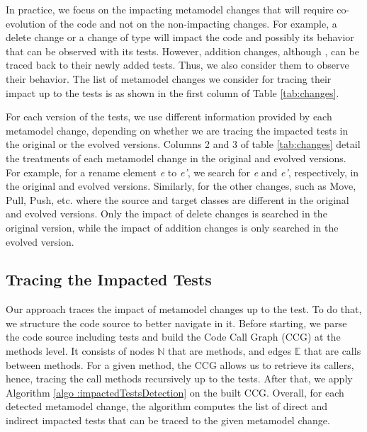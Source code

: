 \blue{}In practice, we focus on the impacting metamodel changes that will require co-evolution of the code and not on the non-impacting changes. For example, a delete change or a change of type will impact the code and possibly its behavior that can be observed with its tests. 
However, addition changes, although , can be traced back to their newly added tests. Thus, we also consider them to observe their behavior.
The list of metamodel changes \cite{iovino2012impact,cicchetti_managing_2009} we consider for tracing their impact up to the tests is as shown in the first column of Table \ref{tab:changes}. 

For each version of the tests, we use different information provided by each metamodel change, depending on whether we are tracing the impacted tests in the original or the evolved versions. Columns 2 and 3 of table \ref{tab:changes} detail the treatments of each metamodel change in the original and evolved versions. For example, for a rename element \emph{e} to \emph{e'}, we search for \emph{e} and \emph{e'}, respectively, in the original and evolved versions. Similarly, for the other changes, such as Move, Pull, Push, etc. where the source and target classes are different in the original and evolved versions. Only the impact of delete changes is searched in the original version, while the impact of addition changes is only searched in the evolved version. 





\subsection{Tracing the Impacted Tests}
\label{section: tracing the impacted tests}
\red{}


Our approach traces the impact of metamodel changes up to the test. To do that, we structure the code source to better navigate in it. 
Before starting, we parse the code source including tests and build the Code Call Graph (CCG) at the methods level. It consists of nodes $\mathbb{N}$ that are methods, and edges $\mathbb{E}$ that are calls between methods. 
For a given method, the CCG allows us to retrieve its callers, hence, tracing the call methods recursively up to the tests. %
After that, we apply Algorithm \ref{algo :impactedTestsDetection} on the built CCG. Overall, for each detected metamodel change, the algorithm computes the list of direct and indirect impacted tests that can be traced to the given metamodel change. 


